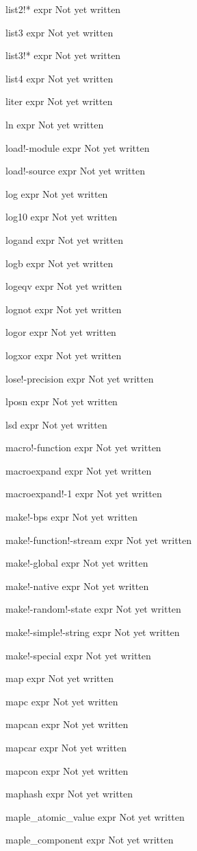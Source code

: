 \documentclass[a4paper,11pt]{article}
\begin{document}
\begin{description}
list2!* expr
Not yet written

list3 expr
Not yet written

list3!* expr
Not yet written

list4 expr
Not yet written

liter expr
Not yet written

ln expr
Not yet written

load!-module expr
Not yet written

load!-source expr
Not yet written

log expr
Not yet written

log10 expr
Not yet written

logand expr
Not yet written

logb expr
Not yet written

logeqv expr
Not yet written

lognot expr
Not yet written

logor expr
Not yet written

logxor expr
Not yet written

lose!-precision expr
Not yet written

lposn expr
Not yet written

lsd expr
Not yet written

macro!-function expr
Not yet written

macroexpand expr
Not yet written

macroexpand!-1 expr
Not yet written

make!-bps expr
Not yet written

make!-function!-stream expr
Not yet written

make!-global expr
Not yet written

make!-native expr
Not yet written

make!-random!-state expr
Not yet written

make!-simple!-string expr
Not yet written

make!-special expr
Not yet written

map expr
Not yet written

mapc expr
Not yet written

mapcan expr
Not yet written

mapcar expr
Not yet written

mapcon expr
Not yet written

maphash expr
Not yet written

maple\_atomic\_value expr
Not yet written

maple\_component expr
Not yet written


\end{description}
\end{document}
